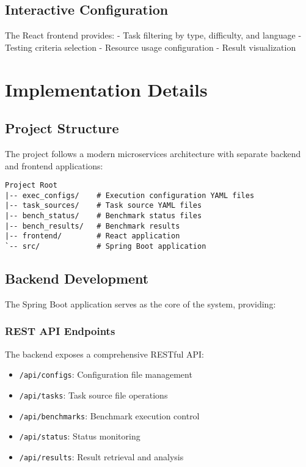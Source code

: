 \section{Interactive Configuration}

The React frontend provides:
- Task filtering by type, difficulty, and language
- Testing criteria selection
- Resource usage configuration
- Result visualization

\chapter{Implementation Details}

\section{Project Structure}

The project follows a modern microservices architecture with separate backend and frontend applications:

\begin{verbatim}
Project Root
|-- exec_configs/    # Execution configuration YAML files
|-- task_sources/    # Task source YAML files
|-- bench_status/    # Benchmark status files
|-- bench_results/   # Benchmark results
|-- frontend/        # React application
`-- src/             # Spring Boot application
\end{verbatim}

\section{Backend Development}

The Spring Boot application serves as the core of the system, providing:

\subsection{REST API Endpoints}
The backend exposes a comprehensive RESTful API:
\begin{itemize}
    \item \texttt{/api/configs}: Configuration file management
    \item \texttt{/api/tasks}: Task source file operations
    \item \texttt{/api/benchmarks}: Benchmark execution control
    \item \texttt{/api/status}: Status monitoring
    \item \texttt{/api/results}: Result retrieval and analysis
\end{itemize}

